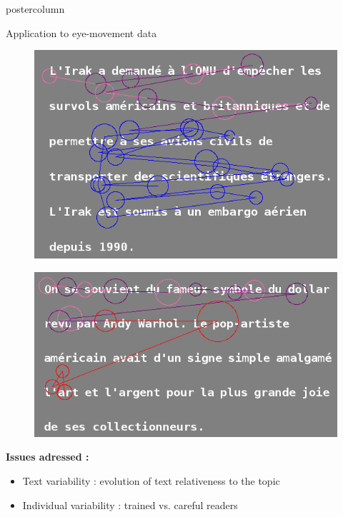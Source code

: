 \documentclass[final,hyperref={pdfpagelabels=false}]{beamer}
\begin{document}
\begin{frame}
\begin{columns}
\begin{column}{.50\textwidth}
\begin{beamercolorbox}[center,wd=\textwidth]{postercolumn}
\begin{minipage}[T]{.98\textwidth}
{\begin{block}{Application to eye-movement data}
\begin{minipage}{0.47\textwidth}
\begin{figure}[h]
                        \includegraphics[width=18cm]{scanpath-careful-reader-subj-8-text-14.png}
                    \end{figure}
                \end{minipage} \hfill
                \begin{minipage}{0.47\textwidth}
                    \begin{figure}[h]
                        \centering
                        \includegraphics[width=18cm]{scanpath-trained-reader-subj-13-text-5.png}
                    \end{figure}
                \end{minipage}
                \textbf{Issues adressed :}
                \begin{itemize}
                    \item[\bullet] Text variability : evolution of text relativeness to the topic
                    \item[\bullet] Individual variability : trained vs. careful readers
                \end{itemize}
            \end{block}

}
\end{minipage}
\end{beamercolorbox}
\end{column}
\end{columns}
\end{frame}
\end{document}
